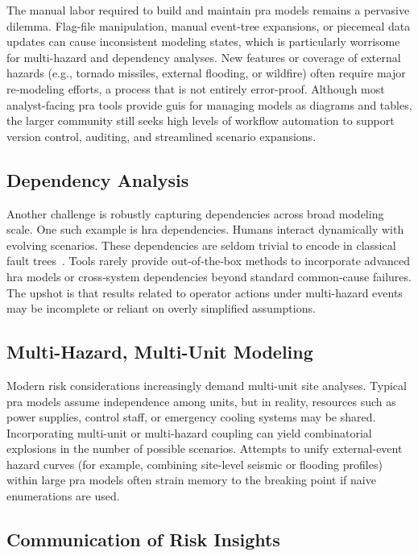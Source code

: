 The manual labor required to build and maintain \acrshort{pra} models remains a pervasive dilemma. Flag-file manipulation, manual event-tree expansions, or piecemeal data updates can cause inconsistent modeling states, which is particularly worrisome for multi-hazard and dependency analyses. New features or coverage of external hazards (e.g., tornado missiles, external flooding, or wildfire) often require major re‐modeling efforts, a process that is not entirely error-proof. Although most analyst-facing \acrshort{pra} tools provide \acrshort{gui}s for managing models as diagrams and tables, the larger community still seeks high levels of workflow automation to support version control, auditing, and streamlined scenario expansions.

\subsection{Dependency Analysis}

Another challenge is robustly capturing dependencies across broad modeling scale. One such example is \acrfull{hra} dependencies. Humans interact dynamically with evolving scenarios. These dependencies are seldom trivial to encode in classical fault trees~\cite{diaconeasa_ads-idac_2017, diaconeasa_branching_2018}. Tools rarely provide out‐of‐the‐box methods to incorporate advanced \acrshort{hra} models or cross‐system dependencies beyond standard common-cause failures. The upshot is that results related to operator actions under multi-hazard events may be incomplete or reliant on overly simplified assumptions.

\subsection{Multi-Hazard, Multi-Unit Modeling}

Modern risk considerations increasingly demand multi-unit site analyses. Typical \acrshort{pra} models assume independence among units, but in reality, resources such as power supplies, control staff, or emergency cooling systems may be shared. Incorporating multi-unit or multi-hazard coupling can yield combinatorial explosions in the number of possible scenarios. Attempts to unify external-event hazard curves (for example, combining site-level seismic or flooding profiles) within large \acrshort{pra} models often strain memory to the breaking point if naive enumerations are used.

\subsection{Communication of Risk Insights}

